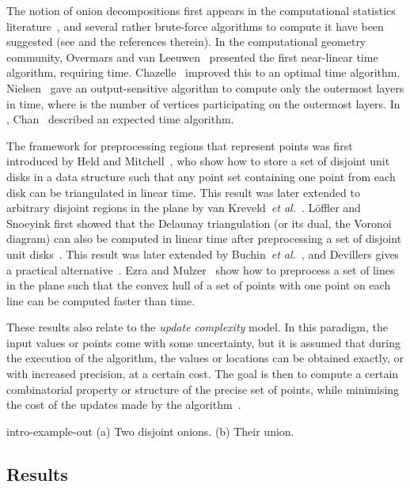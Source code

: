 \documentclass{paper}
\newcommand {\etal} {\textit {et al.}}
\begin{document}
The notion of onion decompositions first appears in the 
computational statistics literature~\cite{h-rsar-72}, and several rather 
brute-force algorithms to compute it have been suggested 
(see \cite{e-chp-82} and the references therein).
In the computational geometry community, Overmars and van 
Leeuwen~\cite{ol-mcp-81} presented the first near-linear time algorithm,  
requiring  time.
Chazelle~\cite{c-clps-85} improved this to an optimal  time 
algorithm.
Nielsen~\cite{n-ospcml-96} gave an output-sensitive algorithm to compute 
only the outermost  layers in  time, where  is the 
number of vertices participating on the outermost  layers.
In , Chan~\cite{c-addsf3cha2nnq-10} described an  
expected time algorithm.

The framework for preprocessing regions that represent points was first 
introduced by Held and Mitchell~\cite {hm-tipps-08}, who show how to store 
a set of disjoint unit disks in a data structure such that any point set 
containing one point from each disk can be triangulated in linear time.
This result was later extended to arbitrary disjoint regions in the plane 
by van Kreveld~\etal~\cite{klm-pipast-10}.
L\"offler and Snoeyink first showed that the Delaunay triangulation (or its 
dual, the Voronoi diagram) can also be computed in linear time after 
preprocessing a set of disjoint unit disks~\cite{ls-dtoipiltap-10}.
This result was later extended by Buchin~\etal~\cite{blmm-pipfdtsae-11},
and Devillers gives a practical alternative~\cite{d-dtoippaagafqt-11}.
Ezra and Mulzer~\cite{em-choipitap-13} show how to preprocess a set of 
lines in the plane such that the convex hull of a set of points with 
one point on each line can be computed faster than  time.

These results also relate to the \emph{update complexity} model. 
In this paradigm, the input values or points come with some uncertainty,
but it is assumed that during the execution of the algorithm, the values or 
locations can be obtained exactly, or with increased precision, at a 
certain cost. 
The goal is then to compute a certain combinatorial property or structure 
of the precise set of points, while minimising the cost of the updates 
made by the 
algorithm~\cite{bhkr-eusgcu-05,fggt-chapa-94,hekmr-cmstu-08,tk-itet-11}.

 {intro-example-out} 
{ (a) Two disjoint onions. (b) Their union.}

\subsection{Results}
\end{document}
